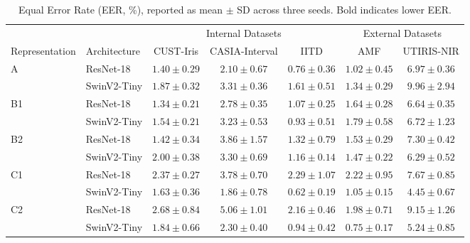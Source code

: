\begin{table}[!t]
\centering
\caption{Equal Error Rate (EER, \%), reported as mean $\pm$ SD across three seeds. Bold indicates lower EER.}
\label{tab:e2a-matched-eer}
\begingroup
\small
\setlength{\tabcolsep}{3.2pt}
\renewcommand{\arraystretch}{1.12}
\begin{tabular*}{\textwidth}{@{\extracolsep{\fill}}llccccc@{}}
\toprule
& & \multicolumn{3}{c}{Internal Datasets} & \multicolumn{2}{c}{External Datasets} \\
\cmidrule(lr){3-5}\cmidrule(l){6-7}
Representation & Architecture & CUST-Iris & CASIA-Interval & IITD & AMF & UTIRIS-NIR \\
\midrule
\multirow{2}{*}{A} & ResNet-18 & {\boldmath $1.40 \pm 0.29$} & {\boldmath $2.10 \pm 0.67$} & {\boldmath $0.76 \pm 0.36$} & {\boldmath $1.02 \pm 0.45$} & {\boldmath $6.97 \pm 0.36$} \\
 & SwinV2-Tiny & $1.87 \pm 0.32$ & $3.31 \pm 0.36$ & $1.61 \pm 0.51$ & $1.34 \pm 0.29$ & $9.96 \pm 2.94$ \\
\midrule
\multirow{2}{*}{B1} & ResNet-18 & {\boldmath $1.34 \pm 0.21$} & {\boldmath $2.78 \pm 0.35$} & $1.07 \pm 0.25$ & {\boldmath $1.64 \pm 0.28$} & {\boldmath $6.64 \pm 0.35$} \\
 & SwinV2-Tiny & $1.54 \pm 0.21$ & $3.23 \pm 0.53$ & {\boldmath $0.93 \pm 0.51$} & $1.79 \pm 0.58$ & $6.72 \pm 1.23$ \\
\midrule
\multirow{2}{*}{B2} & ResNet-18 & {\boldmath $1.42 \pm 0.34$} & $3.86 \pm 1.57$ & $1.32 \pm 0.79$ & $1.53 \pm 0.29$ & $7.30 \pm 0.42$ \\
 & SwinV2-Tiny & $2.00 \pm 0.38$ & {\boldmath $3.30 \pm 0.69$} & {\boldmath $1.16 \pm 0.14$} & {\boldmath $1.47 \pm 0.22$} & {\boldmath $6.29 \pm 0.52$} \\
\midrule
\multirow{2}{*}{C1} & ResNet-18 & $2.37 \pm 0.27$ & $3.78 \pm 0.70$ & $2.29 \pm 1.07$ & $2.22 \pm 0.95$ & $7.67 \pm 0.85$ \\
 & SwinV2-Tiny & {\boldmath $1.63 \pm 0.36$} & {\boldmath $1.86 \pm 0.78$} & {\boldmath $0.62 \pm 0.19$} & {\boldmath $1.05 \pm 0.15$} & {\boldmath $4.45 \pm 0.67$} \\
\midrule
\multirow{2}{*}{C2} & ResNet-18 & $2.68 \pm 0.84$ & $5.06 \pm 1.01$ & $2.16 \pm 0.46$ & $1.98 \pm 0.71$ & $9.15 \pm 1.26$ \\
 & SwinV2-Tiny & {\boldmath $1.84 \pm 0.66$} & {\boldmath $2.30 \pm 0.40$} & {\boldmath $0.94 \pm 0.42$} & {\boldmath $0.75 \pm 0.17$} & {\boldmath $5.24 \pm 0.85$} \\
\bottomrule
\end{tabular*}
\par\vspace{3pt}
\endgroup
\end{table}

